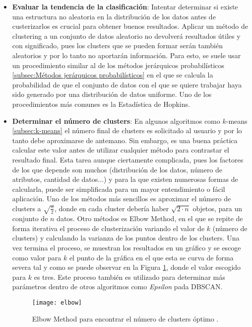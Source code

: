 \documentclass[10pt, a4paper]{article}
\begin{document}
\begin{itemize}
  \item \textbf{Evaluar la tendencia de la clasificación}: Intentar determinar si existe una estructura no aleatoria en la distribución de los datos antes de custerizarlos es crucial para obtener buenos resultados. Aplicar un método de clustering a un conjunto de datos aleatorio no devolverá resultados útiles y con significado, pues los clusters que se pueden formar serán también aleatorios y por lo tanto no aportarán información. Para esto, se suele usar un procedimiento similar al de los métodos jerárquicos probabilísticos \ref{subsec:Métodos jerárquicos probabilísticos} en el que se calcula la probabilidad de que el conjunto de datos con el que se quiere trabajar haya sido generado por una distribución de datos uniforme. Uno de los procedimientos más comunes es la Estadística de Hopkins. 
  
  \item \textbf{Determinar el número de clusters}: En algunos algoritmos como $k$-means \ref{subsec:k-means} el número final de clusters es solicitado al usuario y por lo tanto debe aproximarse de antemano. Sin embargo, es una buena práctica calcular este valor antes de utilizar cualquier método para contrastar el resultado final. Esta tarea aunque ciertamente complicada, pues los factores de los que depende son muchos (distribución de los datos, número de atributos, cantidad de datos...) y para la que existen numerosas formas de calcularla, puede ser simplificada para un mayor entendimiento o fácil aplicación.  Uno de los métodos más sencillos es aproximar el número de clusters a $\sqrt{\frac{n}{2}}$, donde en cada cluster debería haber $\sqrt{2 \cdotp n}$ objetos, para un conjunto de $n$ datos. Otro métodos es Elbow Method, en el que se repite de forma iterativa el proceso de clusterización variando el valor de $k$ (número de clusters) y calculando la varianza de los puntos dentro de los clusters. Una vez termina el proceso, se muestran los resultados en un gráfico y se escoge como valor para $k$ el punto de la gráfica en el que esta se curva de forma severa tal y como se puede observar en la Figura \ref{fig:elbow}, donde el valor escogido para $k$ es tres. Este proceso también es utilizado para determinar más parámetros dentro de otros algoritmos como \textit{Epsilon} pada DBSCAN. 
  
\begin{figure}[ht]
\centering
\texttt{[image: elbow]}
\caption{Elbow Method para encontrar el número de clusters óptimo \cite{elbow}.}
\label{fig:elbow}
\end{figure}
  

\end{itemize}
\end{document}
